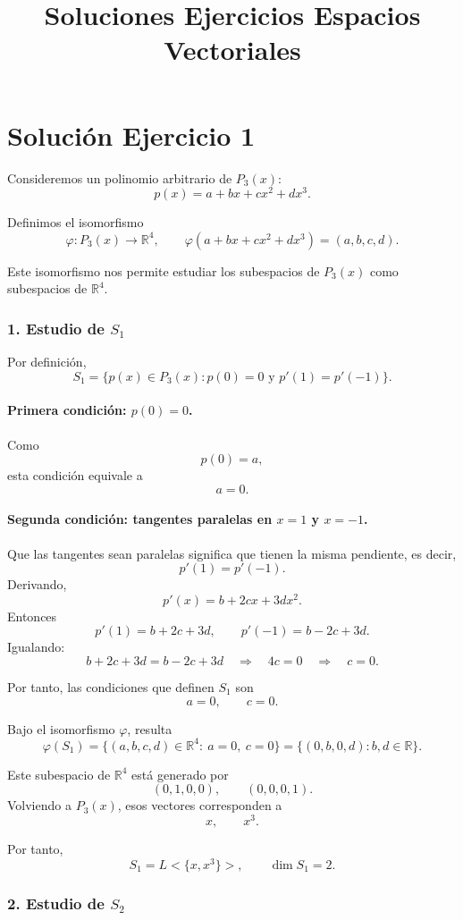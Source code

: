 \documentclass[12pt]{article}
\title{Soluciones Ejercicios Espacios Vectoriales}
\author{}
\begin{document}
\section*{Solución Ejercicio 1}

Consideremos un polinomio arbitrario de \(P_3(x)\):
\[
p(x)=a+bx+cx^2+dx^3.
\]

Definimos el isomorfismo
\[
\varphi:P_3(x)\longrightarrow \mathbb{R}^4,
\qquad
\varphi(a+bx+cx^2+dx^3)=(a,b,c,d).
\]

Este isomorfismo nos permite estudiar los subespacios de \(P_3(x)\) como subespacios de \(\mathbb{R}^4\).

\subsubsection*{1. Estudio de \(S_1\)}

Por definición,
\[
S_1=\{p(x)\in P_3(x): p(0)=0 \text{ y } p'(1)=p'(-1)\}.
\]

\paragraph{Primera condición: \(p(0)=0\).}

Como
\[
p(0)=a,
\]
esta condición equivale a
\[
a=0.
\]

\paragraph{Segunda condición: tangentes paralelas en \(x=1\) y \(x=-1\).}

Que las tangentes sean paralelas significa que tienen la misma pendiente, es decir,
\[
p'(1)=p'(-1).
\]
Derivando,
\[
p'(x)=b+2cx+3dx^2.
\]
Entonces
\[
p'(1)=b+2c+3d,
\qquad
p'(-1)=b-2c+3d.
\]
Igualando:
\[
b+2c+3d=b-2c+3d
\quad\Longrightarrow\quad
4c=0
\quad\Longrightarrow\quad
c=0.
\]

Por tanto, las condiciones que definen \(S_1\) son
\[
a=0,\qquad c=0.
\]

Bajo el isomorfismo \(\varphi\), resulta
\[
\varphi(S_1)=\{(a,b,c,d)\in\mathbb{R}^4:\ a=0,\ c=0\}
=\{(0,b,0,d): b,d\in\mathbb{R}\}.
\]

Este subespacio de \(\mathbb{R}^4\) está generado por
\[
(0,1,0,0),\qquad (0,0,0,1).
\]
Volviendo a \(P_3(x)\), esos vectores corresponden a
\[
x,\qquad x^3.
\]

Por tanto,
\[
S_1=L<\{x,x^3\}>,
\qquad
\dim S_1=2.
\]

\subsubsection*{2. Estudio de \(S_2\)}
\end{document}
